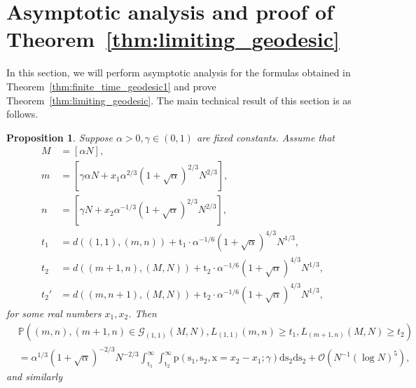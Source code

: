 \documentclass{article}
\newtheorem{prop}[thm]{Proposition}
\numberwithin{equation}{section}
\newcommand{\bigO}{\mathcal{O}}
\newcommand{\gd}{{\mathcal{G}}}
\newcommand{\limp}{\mathrm{p}}
\newcommand{\prob}{\mathbb{P}}
\begin{document}
\section{Asymptotic analysis and proof of Theorem~\ref{thm:limiting_geodesic}}
\label{sec:proof_thm2}
 
 In this section, we will perform asymptotic analysis for the formulas obtained in Theorem~\ref{thm:finite_time_geodesic1} and prove Theorem~\ref{thm:limiting_geodesic}. 
The main technical result of this section is as follows.
\begin{prop}
	\label{prop:asymptotics_density}Suppose $\alpha>0, \gamma\in(0,1)$ are fixed constants. Assume that
	\begin{equation}
		\label{eq:scaling}
		\begin{split}
			M&= [\alpha N],\\
			m&=[\gamma\alpha N + x_1 \alpha^{2/3}(1+\sqrt{\alpha})^{2/3} N^{2/3}],\\
			n&=[\gamma N + x_2 \alpha^{-1/3}(1+\sqrt{\alpha})^{2/3} N^{2/3}],\\
			t_1&=d((1,1),(m,n)) + \mathrm{t}_1\cdot \alpha^{-1/6}(1+\sqrt{\alpha})^{4/3}N^{1/3},\\
			t_2&=d((m+1,n),(M,N)) +\mathrm{t}_2 \cdot 
			\alpha^{-1/6}(1+\sqrt{\alpha})^{4/3}N^{1/3},\\
			t_2'&=d((m,n+1),(M,N)) +\mathrm{t}_2 \cdot 
			\alpha^{-1/6}(1+\sqrt{\alpha})^{4/3}N^{1/3},
		\end{split}
	\end{equation}
for some real numbers $x_1,x_2$. Then
\begin{equation}
	\label{eq:estimate_vertical}
	\begin{split}
		&\prob
		\left(
			(m,n),(m+1,n)\in \gd_{(1,1)}(M,N), L_{(1,1)}(m,n)\ge t_1,
			L_{(m+1,n)}(M,N)\ge t_2
		\right)\\
		&=\alpha^{1/3}(1+\sqrt{\alpha})^{-2/3}N^{-2/3}\int_{\mathrm{t}_1}^\infty \int_{\mathrm{t}_2}^\infty\limp(\mathrm{s}_1,\mathrm{s}_2,\mathrm{x}=x_2-x_1;\gamma)\mathrm{d}{\mathrm{s}_2}\mathrm{d}{\mathrm{s}_2}+\bigO(N^{-1}(\log N)^5),
		\end{split}
\end{equation}
and similarly
\begin{equation}
	\label{eq:estimate_horizontal}

\end{equation}
\end{prop}
\end{document}
